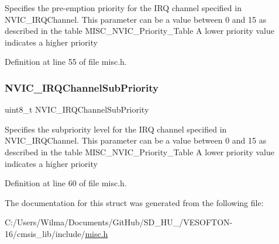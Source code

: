 Specifies the pre-\/emption priority for the I\+RQ channel specified in N\+V\+I\+C\+\_\+\+I\+R\+Q\+Channel. This parameter can be a value between 0 and 15 as described in the table M\+I\+S\+C\+\_\+\+N\+V\+I\+C\+\_\+\+Priority\+\_\+\+Table A lower priority value indicates a higher priority 

Definition at line 55 of file misc.\+h.

\mbox{\label{struct_n_v_i_c___init_type_def_a91b24559ddbc12752f2414582fb47cb9}} 
\subsubsection{\texorpdfstring{N\+V\+I\+C\+\_\+\+I\+R\+Q\+Channel\+Sub\+Priority}{NVIC\_IRQChannelSubPriority}}
{\footnotesize\ttfamily uint8\+\_\+t N\+V\+I\+C\+\_\+\+I\+R\+Q\+Channel\+Sub\+Priority}

Specifies the subpriority level for the I\+RQ channel specified in N\+V\+I\+C\+\_\+\+I\+R\+Q\+Channel. This parameter can be a value between 0 and 15 as described in the table M\+I\+S\+C\+\_\+\+N\+V\+I\+C\+\_\+\+Priority\+\_\+\+Table A lower priority value indicates a higher priority 

Definition at line 60 of file misc.\+h.



The documentation for this struct was generated from the following file\+:\begin{DoxyCompactItemize}
\item 
C\+:/\+Users/\+Wilma/\+Documents/\+Git\+Hub/\+S\+D\+\_\+\+H\+U\+\_/\+V\+E\+S\+O\+F\+T\+O\+N-\/16/cmsis\+\_\+lib/include/\hyperlink{misc_8h}{misc.\+h}\end{DoxyCompactItemize}
